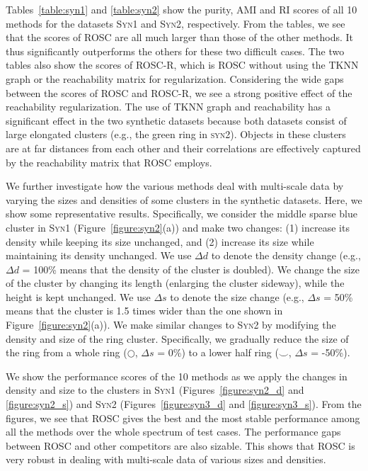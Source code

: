 Tables~\ref{table:syn1} and \ref{table:syn2} show the purity, AMI and RI scores of all 10 methods
for the datasets \textsc{Syn1} and \textsc{Syn2}, respectively. 
From the tables, we see that the scores of ROSC are all much larger than those of the other methods.
It thus significantly outperforms the others for these two difficult cases. 
The two tables also show the scores of ROSC-R, which is ROSC without using the TKNN graph or
the reachability matrix for regularization. Considering the wide gaps between the scores of ROSC and
ROSC-R, we see a strong positive effect of the reachability regularization. 
The use of TKNN graph and reachability has a significant effect in the two synthetic datasets because
both datasets consist of large elongated clusters (e.g., the green ring in \textsc{syn2}).
Objects in these clusters are at far distances from each other and their correlations are effectively captured by
the reachability matrix that ROSC employs.
 
We further investigate how the various methods deal with multi-scale data by varying the sizes and densities
of some clusters in the synthetic datasets. 
Here, we show some representative results. 
Specifically, we consider the middle sparse blue cluster in \textsc{Syn1} (Figure~\ref{figure:syn2}(a))
and make two changes: 
(1) increase its density while keeping its size unchanged, and
(2) increase its size while maintaining its density unchanged.
We use $\Delta d$ to denote the density change
(e.g., $\Delta d$ = 100\% means that the density of the cluster is doubled).
We change the size of the cluster by changing its length
(enlarging the cluster sideway), while the height is kept unchanged.
We use $\Delta s$ to denote the size change
(e.g., $\Delta s$ = 50\% means that the cluster is 1.5 times wider than the one shown in Figure~\ref{figure:syn2}(a)).
We make similar changes to \textsc{Syn2} by modifying the density and size of the ring cluster. 
Specifically, we gradually reduce the size of the ring from a whole ring ($\bigcirc$, $\Delta s$ = 0\%)
to a lower half ring ($\smile$, $\Delta s$ = -50\%).

We show the performance scores of the 10 methods 
as we apply the changes in density and size to the clusters in \textsc{Syn1}
(Figures~\ref{figure:syn2_d} and \ref{figure:syn2_s})
 and \textsc{Syn2}
 (Figures~\ref{figure:syn3_d} and \ref{figure:syn3_s}).
From the figures, we see 
that  ROSC gives the best and the most stable performance among all the methods 
over the whole spectrum of test cases. 
The performance gaps between ROSC and other competitors are also sizable. 
This shows that ROSC is very robust in dealing with multi-scale data of various sizes and densities.
 
